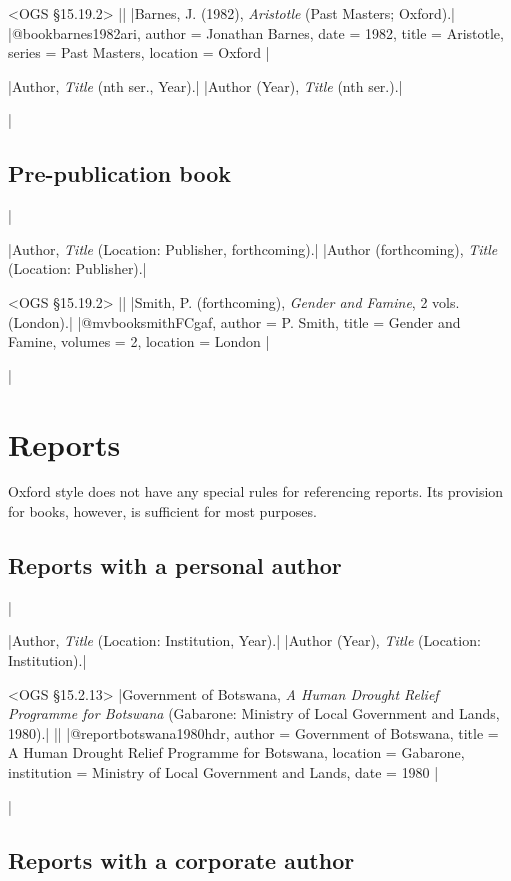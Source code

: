 \documentclass[extrafontsizes,11pt,a4paper,oneside]{memoir}
\newcommand*{\lit}[1]{\textsf{#1}}
\begin{document}
\bibexample<OGS \S15.19.2>
||%
|Barnes, J. (1982), \emph{Aristotle} (Past Masters; Oxford).|%
|@book{barnes1982ari,
  author = {Jonathan Barnes},
  date = {1982},
  title = {Aristotle},
  series = {Past Masters},
  location = {Oxford}
}|

\specs
|Author, \emph{Title} (nth \lit{ser.}, Year).|%
|Author (Year), \emph{Title} (nth \lit{ser.}).|

\todoc|
\section{Pre-publication book}
|

\specs
|Author, \emph{Title} (Location: Publisher, \lit{forthcoming}).|%
|Author (\lit{forthcoming}), \emph{Title} (Location: Publisher).|

\bibexample<OGS \S15.19.2>
||%
|Smith, P. (forthcoming), \emph{Gender and Famine}, 2 vols. (London).|%
|@mvbook{smithFCgaf,
  author = {P. Smith},
  title = {Gender and Famine},
  volumes = {2},
  location = {London}
}|

\todoc|
\chapter{Reports}\label{sec:report}

Oxford style does not have any special rules for referencing reports. Its provision for books, however, is sufficient for most purposes.

\section{Reports with a personal author}
|

\specs
|Author, \emph{Title} (Location: Institution, Year).|%
|Author (Year), \emph{Title} (Location: Institution).|

\bibexample<OGS \S15.2.13>
|Government of Botswana, \emph{A Human Drought Relief Programme for Botswana} (Gabarone: Ministry of Local Government and Lands, 1980).|%
||%
|@report{botswana1980hdr,
  author = {{Government of Botswana}},
  title = {A Human Drought Relief Programme for Botswana},
  location = {Gabarone},
  institution = {Ministry of Local Government and Lands},
  date = {1980}
}|
  
\todoc|
\section{Reports with a corporate author}
\end{document}
